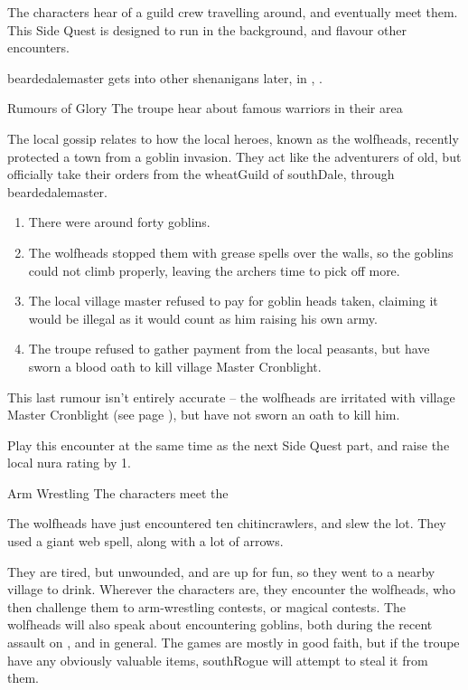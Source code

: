 \label{wolfHeads}

\noindent
The characters hear of a guild crew travelling around, and eventually meet them.
This Side Quest is designed to run in the background, and flavour other encounters.

\Gls{beardedalemaster} gets into other shenanigans later, in , .

{\N \squash Rumours of Glory}%
{The troupe hear about famous warriors in their area}%

The local gossip relates to how the local heroes, known as the \glspl{wolfhead}, recently protected a town from a goblin invasion.
They act like the adventurers of old, but officially take their orders from the \gls{wheatGuild} of \gls{southDale}, through \gls{beardedalemaster}.

\begin{enumerate}
  \item
  There were around forty goblins.
  \item
  The \glspl{wolfhead} stopped them with grease spells over the walls, so the goblins could not climb properly, leaving the archers time to pick off more.
  \item
  The local village master refused to pay for goblin heads taken, claiming it would be illegal as it would count as him raising his own army.
  \item
  The troupe refused to gather payment from the local peasants, but have sworn a blood oath to kill \Gls{village} Master Cronblight.
\end{enumerate}

This last rumour isn't entirely accurate -- the \glspl{wolfhead} are irritated with \Gls{village} Master Cronblight (see page \pageref{cronblight}), but have not sworn an oath to kill him.

Play this encounter at the same time as the next Side Quest part, and raise the local nura rating by 1.

{Arm Wrestling}%
{The characters meet the }%

The \glspl{wolfhead} have just encountered ten chitincrawlers, and slew the lot.
They used a giant web spell, along with a lot of arrows.

They are tired, but unwounded, and are up for fun, so they went to a nearby village to drink.
Wherever the characters are, they encounter the \glspl{wolfhead}, who then challenge them to arm-wrestling contests, or magical contests.
The \glspl{wolfhead} will also speak about encountering goblins, both during the recent assault on , and in general.
The games are mostly in good faith, but if the troupe have any obviously valuable items, \gls{southRogue} will attempt to steal it from them.


